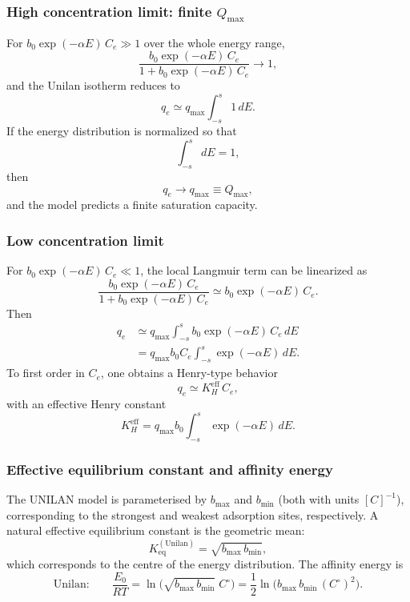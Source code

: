 	\subsubsection{High concentration limit: finite $Q_{\max}$}
	
	For $b_0 \exp(-\alpha E)\, C_e \gg 1$ over the whole energy range,
	\[
	\frac{b_0 \exp(-\alpha E)\, C_e}{1 + b_0 \exp(-\alpha E)\, C_e} \to 1,
	\]
	and the Unilan isotherm reduces to
	\begin{equation}
		q_e \simeq q_{\max} \int_{-s}^{s} 1 \, dE.
	\end{equation}
	If the energy distribution is normalized so that
	\[
	\int_{-s}^{s} dE = 1,
	\]
	then
	\begin{equation}
		q_e \to q_{\max} \equiv Q_{\max},
	\end{equation}
	and the model predicts a finite saturation capacity.
	
	\subsubsection{Low concentration limit}
	
	For $b_0 \exp(-\alpha E)\, C_e \ll 1$, the local Langmuir term can be
	linearized as
	\[
	\frac{b_0 \exp(-\alpha E)\, C_e}{1 + b_0 \exp(-\alpha E)\, C_e}
	\simeq b_0 \exp(-\alpha E)\, C_e.
	\]
	Then
	\begin{align}
		q_e
		&\simeq q_{\max} \int_{-s}^{s} b_0 \exp(-\alpha E)\, C_e \, dE \nonumber \\
		&= q_{\max} b_0 C_e \int_{-s}^{s} \exp(-\alpha E)\, dE.
	\end{align}
	To first order in $C_e$, one obtains a Henry-type behavior
	\begin{equation}
		q_e \simeq K_H^{\mathrm{eff}}\, C_e,
	\end{equation}
	with an effective Henry constant
	\begin{equation}
		K_H^{\mathrm{eff}} = q_{\max} b_0 \int_{-s}^{s} \exp(-\alpha E)\, dE.
	\end{equation}

	\subsubsection{Effective equilibrium constant and affinity energy}

	The UNILAN model is parameterised by $b_{\max}$ and $b_{\min}$ (both
	with units $[C]^{-1}$), corresponding to the strongest and weakest
	adsorption sites, respectively. A natural effective equilibrium constant
	is the geometric mean:
	\begin{equation}
		K_{\mathrm{eq}}^{\mathrm{(Unilan)}}
		= \sqrt{b_{\max}\, b_{\min}},
	\end{equation}
	which corresponds to the centre of the energy distribution. The
	affinity energy is
	\begin{equation}
		\text{Unilan:}\qquad
		\frac{E_0}{RT}
		= \ln\!\bigl(\sqrt{b_{\max}\,b_{\min}}\; C^\circ\bigr)
		= \frac{1}{2}
		\ln\!\bigl(b_{\max}\,b_{\min}\,(C^\circ)^{2}\bigr).
		\label{eq:E_unilan}
	\end{equation}

